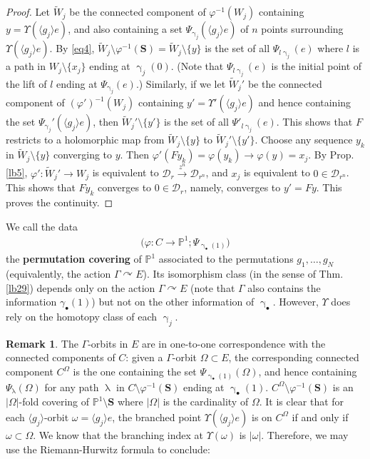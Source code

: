 \documentclass[11pt,b5paper,notitlepage]{article}
\theoremstyle{definition}
\newtheorem{rem}[df]{Remark}
\theoremstyle{plain}
\newcommand{\mc}{\mathcal}
\newcommand{\wtd}{\widetilde}
\newcommand{\bk}[1]{\langle {#1}\rangle}
\newcommand{\blt}{\bullet}
\newcommand{\Pbb}{\mathbb P}
\newcommand{\Sbf}{\mathbf{S}}
\numberwithin{equation}{subsection}
\begin{document}
\begin{proof}
Let $\wtd W_j$ be the connected component of $\varphi^{-1}(W_j)$ containing $y=\Upsilon(\bk{g_j}e)$, and also containing a set $\Psi_{\upgamma_j}(\bk{g_j}e)$ of $n$ points surrounding $\Upsilon(\bk{g_j}e)$. By \eqref{eq4}, $\wtd W_j\setminus\varphi^{-1}(\Sbf)=\wtd W_j\setminus\{y\}$ is  the set of all $\Psi_{l\upgamma_j}(e)$ where $l$ is a path in $W_j\setminus\{x_j\}$ ending at $\upgamma_j(0)$. (Note that $\Psi_{l\upgamma_j}(e)$ is the initial point of the lift of $l$ ending at $\Psi_{\upgamma_j}(e)$.) Similarly, if we let $\wtd W_j'$ be the connected component of $(\varphi')^{-1}(W_j)$ containing $y'=\Upsilon'(\bk{g_j}e)$ and hence containing the set $\Psi_{\upgamma_j}'(\bk{g_j}e)$, then $\wtd W_j'\setminus\{y'\}$ is the set of all $\Psi'_{l\upgamma_j}(e)$. This shows that $F$ restricts to a holomorphic map from $\wtd W_j\setminus\{y\}$ to $\wtd W_j'\setminus\{y'\}$. Choose any sequence $y_k$ in $\wtd W_j\setminus\{y\}$ converging to $y$. Then $\varphi'(Fy_k)=\varphi(y_k)\rightarrow \varphi(y)=x_j$. By Prop. \ref{lb5}, $\varphi':\wtd W_j'\rightarrow W_j$ is equivalent to $\mc D_r\xrightarrow{z^n}\mc D_{r^n}$, and $x_j$ is equivalent to $0\in\mc D_{r^n}$. This shows that $Fy_k$ converges to $0\in\mc D_r$, namely, converges to $y'=Fy$. This proves the continuity.
\end{proof}

We call the data \index{zz@$\varphi:C\rightarrow\Pbb^1$}
\begin{align*}
\big(\varphi:C\rightarrow\Pbb^1;\Psi_{\upgamma_\blt(1)}\big)
\end{align*}
the \textbf{permutation covering} of $\Pbb^1$ associated to the permutations $g_1,\dots,g_N$ (equivalently, the action $\Gamma\curvearrowright E$). Its isomorphism class (in the sense of Thm. \ref{lb29}) depends only on the action $\Gamma\curvearrowright E$ (note that $\Gamma$ also contains the information $\gamma_\blt(1)$) but not on the other information of $\upgamma_\blt$. However, $\Upsilon$ does rely on the homotopy class of each $\upgamma_j$.





\begin{rem}
The $\Gamma$-orbits in $E$ are in one-to-one correspondence with the connected components of $C$: given a $\Gamma$-orbit $\Omega\subset E$, the corresponding connected component $C^\Omega$ is the one containing the set $\Psi_{\upgamma_\blt(1)}(\Omega)$, and hence containing $\Psi_{\uplambda}(\Omega)$ for any path $\uplambda$ in $C\setminus\varphi^{-1}(\Sbf)$ ending at $\upgamma_\blt(1)$. $C^\Omega\setminus\varphi^{-1}(\Sbf)$ is an $|\Omega|$-fold covering of $\Pbb^1\setminus\Sbf$ where $|\Omega|$ is the cardinality of $\Omega$. It is clear that for each $\bk{g_j}$-orbit $\omega=\bk{g_j}e$, the branched point $\Upsilon(\bk{g_j}e)$ is on $C^\Omega$ if and only if $\omega\subset\Omega$. We know that the branching index at $\Upsilon(\omega)$ is $|\omega|$. Therefore, we may use the Riemann-Hurwitz formula \cite[17.14]{For} to conclude:
\end{rem}
\end{document}
